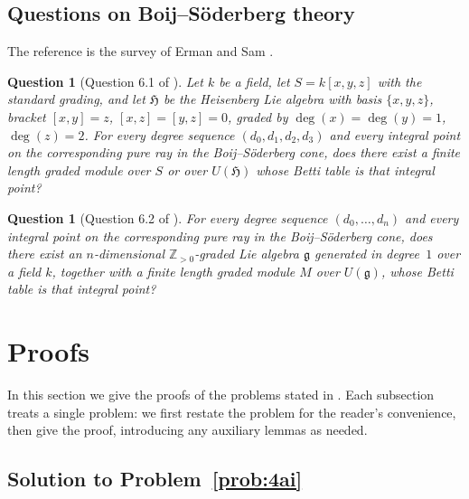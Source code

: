 \documentclass[11pt,reqno]{amsart}
\numberwithin{equation}{section}
\newtheorem{question}[thm]{Question}
\theoremstyle{definition}
\begin{document}
\subsection{Questions on Boij--S\"oderberg theory}
\label{subsec:bs}

The reference is the survey of Erman and Sam
\cite{ErmanSam2017}.

\begin{question}[Question 6.1 of \cite{ErmanSam2017}]\label{q:bs61}
Let $k$ be a field, let $S=k[x,y,z]$ with the standard grading, and let
$\mathfrak H$ be the Heisenberg Lie algebra with basis $\{x,y,z\}$,
bracket $[x,y]=z$, $[x,z]=[y,z]=0$, graded by $\deg(x)=\deg(y)=1$,
$\deg(z)=2$. For every degree sequence $(d_0,d_1,d_2,d_3)$ and every
integral point on the corresponding pure ray in the Boij--S\"oderberg
cone, does there exist a finite length graded module over $S$ or over
$U(\mathfrak H)$ whose Betti table is that integral point?
\end{question}

\begin{question}[Question 6.2 of \cite{ErmanSam2017}]\label{q:bs62}
For every degree sequence $(d_0,\dots,d_n)$ and every integral point on
the corresponding pure ray in the Boij--S\"oderberg cone, does there exist
an $n$-dimensional $\mathbb Z_{>0}$-graded Lie algebra $\mathfrak g$
generated in degree~$1$ over a field $k$, together with a finite length
graded module $M$ over $U(\mathfrak g)$, whose Betti table is that
integral point?
\end{question}




\section{Proofs}\label{sec:proofs}

In this section we give the proofs of the problems stated in
. Each subsection treats a single problem: we first
restate the problem for the reader's convenience, then give the proof,
introducing any auxiliary lemmas as needed.

\subsection{Solution to Problem~\ref{prob:4ai}}\label{subsec:proof-4ai}
\end{document}
